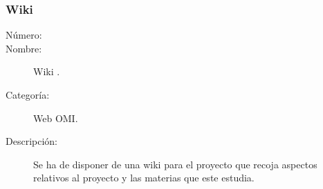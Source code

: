 \subsubsection{Wiki}
	\begin{description}
		\item [Número:] \cn
		\item [Nombre:] Wiki .
		\item [Categoría:] Web OMI.
		\item [Descripción:]  Se ha de disponer de una wiki para el proyecto que recoja aspectos relativos al proyecto y las materias que este estudia.
	\end {description}



